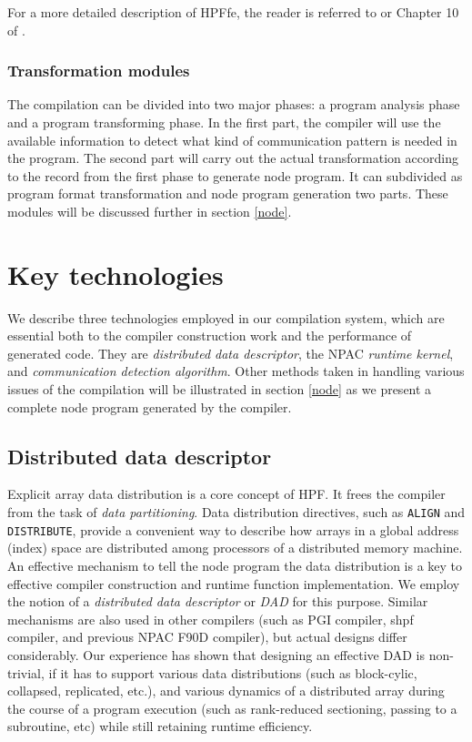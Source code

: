 For a more detailed description of HPFfe, the reader is
referred to \cite{hpffe:1} or Chapter 10 of \cite{Li97}. 

\subsubsection*{Transformation modules}

The compilation can be divided into two major phases: a program analysis
phase and a program transforming phase.
In the first part, the compiler will use the available information
to detect what kind of communication pattern is needed in the program.
The second part will carry out the actual transformation according to
the record from the first phase to generate node program.  It can
subdivided as program format transformation and node program
generation two parts.
These modules will be discussed further in section \ref{node}.

\section{Key technologies}
\label{preli}

We describe three technologies employed in our compilation system,
which are essential both to the compiler construction work and
the performance of generated code. They are {\em distributed data
descriptor}, the NPAC {\em runtime kernel}, and {\em communication
detection algorithm}.  Other methods taken in handling various issues
of the compilation will be illustrated in section \ref{node} as we
present a complete node program generated by the compiler.

\subsection{Distributed data descriptor}

Explicit array data distribution is a core concept of HPF.
It frees the compiler from the task of {\em data partitioning}.
Data distribution directives, such as {\tt ALIGN} and {\tt DISTRIBUTE}, 
provide a convenient way to describe
how arrays in a global address (index) space are distributed among
processors of a distributed memory machine.
An effective mechanism to tell the node program the data distribution
is a key to effective compiler construction and runtime function
implementation.  We employ the notion of a {\em distributed data
descriptor} or {\em DAD} for this purpose.  Similar mechanisms are
also used in
other compilers (such as PGI compiler, shpf compiler, and previous
NPAC F90D compiler), but 
actual designs differ considerably.  Our experience has shown that
designing an effective DAD is non-trivial, if it has to support various
data distributions (such as block-cylic, collapsed, replicated,
etc.), and various dynamics of a distributed array during the course of
a program execution (such as rank-reduced sectioning, passing to a
subroutine, etc) while still retaining runtime efficiency.

